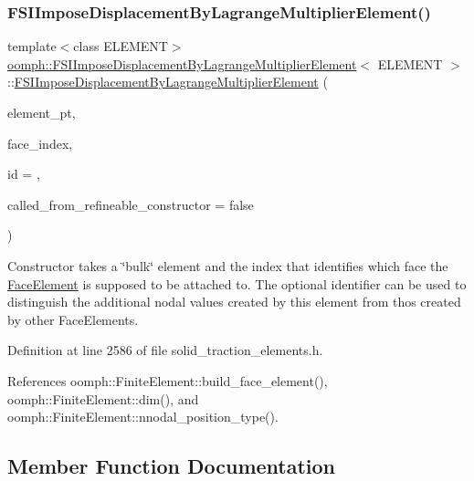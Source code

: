 \subsubsection{\texorpdfstring{F\+S\+I\+Impose\+Displacement\+By\+Lagrange\+Multiplier\+Element()}{FSIImposeDisplacementByLagrangeMultiplierElement()}}
{\footnotesize\ttfamily template$<$class E\+L\+E\+M\+E\+NT$>$ \\
\hyperlink{classoomph_1_1FSIImposeDisplacementByLagrangeMultiplierElement}{oomph\+::\+F\+S\+I\+Impose\+Displacement\+By\+Lagrange\+Multiplier\+Element}$<$ E\+L\+E\+M\+E\+NT $>$\+::\hyperlink{classoomph_1_1FSIImposeDisplacementByLagrangeMultiplierElement}{F\+S\+I\+Impose\+Displacement\+By\+Lagrange\+Multiplier\+Element} (\begin{DoxyParamCaption}\item[{\hyperlink{classoomph_1_1FiniteElement}{Finite\+Element} $\ast$const \&}]{element\+\_\+pt,  }\item[{const int \&}]{face\+\_\+index,  }\item[{const unsigned \&}]{id = {},  }\item[{const bool \&}]{called\+\_\+from\+\_\+refineable\+\_\+constructor = {\ttfamily false} }\end{DoxyParamCaption})\hspace{0.3cm}{\ttfamily [inline]}}



Constructor takes a \char`\"{}bulk\char`\"{} element and the index that identifies which face the \hyperlink{classoomph_1_1FaceElement}{Face\+Element} is supposed to be attached to. The optional identifier can be used to distinguish the additional nodal values created by this element from thos created by other Face\+Elements. 



Definition at line 2586 of file solid\+\_\+traction\+\_\+elements.\+h.



References oomph\+::\+Finite\+Element\+::build\+\_\+face\+\_\+element(), oomph\+::\+Finite\+Element\+::dim(), and oomph\+::\+Finite\+Element\+::nnodal\+\_\+position\+\_\+type().



\subsection{Member Function Documentation}
\mbox{\label{classoomph_1_1FSIImposeDisplacementByLagrangeMultiplierElement_ad53849f509cfd0d3eb469bfacf7cfabf}} 
